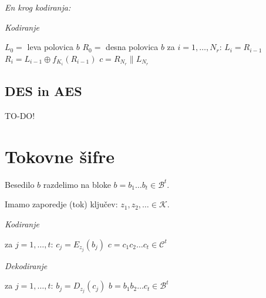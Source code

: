 \begin{multicols}{4}
\textit{En krog kodiranja:}
\begin{center}
\end{center}

\textit{Kodiranje}
\begin{koda}
$L_0 = $ leva polovica $b$
$R_0 = $ desna polovica $b$
za $i = 1, \dots, N_r$:
	$L_i = R_{i-1}$
	$R_i = L_{i-1} \oplus f_{K_i}(R_{i-1})$
$c = R_{N_r} \| L_{N_r}$
\end{koda}

\subsection*{DES in AES}
TO-DO!

\section*{Tokovne šifre}
Besedilo $b$ razdelimo na bloke $b = b_1 \dots b_t \in \mathcal{B}^t$.

Imamo zaporedje (tok) ključev: $z_1, z_2, \dots \in \mathcal{K}$.

\textit{Kodiranje}
\begin{koda}
za $j = 1, \dots, t$:
	$c_j = E_{z_j}(b_j)$
$c = c_1 c_2 \dots c_t \in \mathcal{C}^t$
\end{koda}

\textit{Dekodiranje}
\begin{koda}
za $j = 1, \dots, t$:
	$b_j = D_{z_j}(c_j)$
$b = b_1 b_2 \dots c_t \in \mathcal{B}^t$
\end{koda}


\end{multicols}

